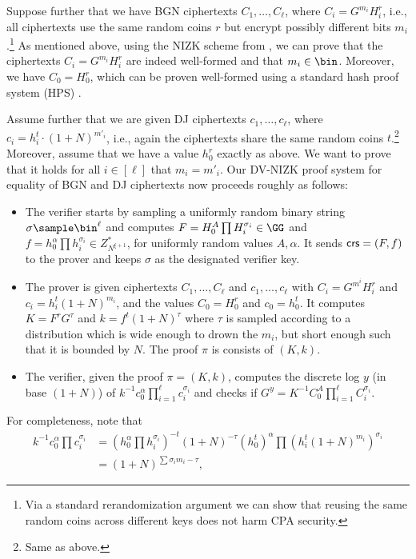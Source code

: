 Suppose further that we have BGN ciphertexts $C_1,\dots, C_\ell$, where $C_i = G^{m_i} H_i^r$, i.e., all ciphertexts use the same random coins $r$ but encrypt possibly different bits $m_i$.\footnote{Via a standard rerandomization argument we can show that reusing the same random coins across different keys does not harm CPA security.} As mentioned above, using the NIZK scheme from \cite{EC:GroOstSah06}, we can prove that the ciphertexts $C_i = G^{m_i} H_i^{r}$ are indeed well-formed and that $m_i\in\bin$. Moreover, we have $C_0=H_0^r$, which can be proven well-formed using a standard hash proof system (HPS) \cite{EC:CraSho02}.

Assume further that we are given  DJ ciphertexts $c_1,\dots,c_\ell$, where $c_i = h_i^t \cdot (1 + N)^{m'_i}$, i.e., again the ciphertexts share the same random coins $t$.\footnote{Same as above.} Moreover, assume that we have a value $h_0^r$ exactly as above. We want to prove that it holds for all $i \in [\ell]$ that $m_i = m'_i$. Our DV-NIZK proof system for equality of BGN and DJ ciphertexts now proceeds roughly as follows:
\begin{itemize}
    \item The verifier starts by sampling a uniformly random binary string $\sigma\sample \bin^\ell$ and computes $F=H_0^A\prod H_i^{\sigma_i} \in \GG$ and $f=h_0^\alpha\prod h_i^{\sigma_i} \in Z_{N^{\xi + 1}}^\ast$, for uniformly random values $A,\alpha$. It sends $\mathsf{crs}=(F,f)$ to the prover and keeps $\sigma$ as the designated verifier key.
    \item The prover is given ciphertexts $C_1,\dots,C_\ell$ and $c_1,\dots,c_\ell$ with $C_i=G^{m^i}H_i^r$ and $c_i=h_i^t(1+N)^{m_i}$, and the values $C_0=H_0^r$ and $c_0=h_0^t$. It computes $K=F^rG^\tau$ and $k=f^t(1+N)^\tau$ where $\tau$ is sampled according to a distribution which is wide enough to drown the $m_i$, but short enough such that it is bounded by $N$. The proof $\pi$ is consists of $(K,k)$.
    \item The verifier, given the proof $\pi = (K,k)$, computes the discrete log $y$ (in base $(1+N)$) of $k^{-1}c_0^\alpha\prod_{i=1}^\ell c_i^{\sigma_i}$ and checks if $G^y=K^{-1}C_0^A\prod_{i=1}^\ell C_i^{\sigma_i}$.
\end{itemize}
 
For completeness, note that
\begin{align*}
    k^{-1}c_0^\alpha\prod c_i^{\sigma_i} & = \left (h_0^\alpha\prod h_i^{\sigma_i}\right)^{-t} (1+N)^{-\tau}\left(h_0^{t}\right)^\alpha\prod \left(h_i^t(1+N)^{m_i}\right)^{\sigma_i} \\ &=(1+N)^{\sum \sigma_im_i-\tau},
\end{align*}

